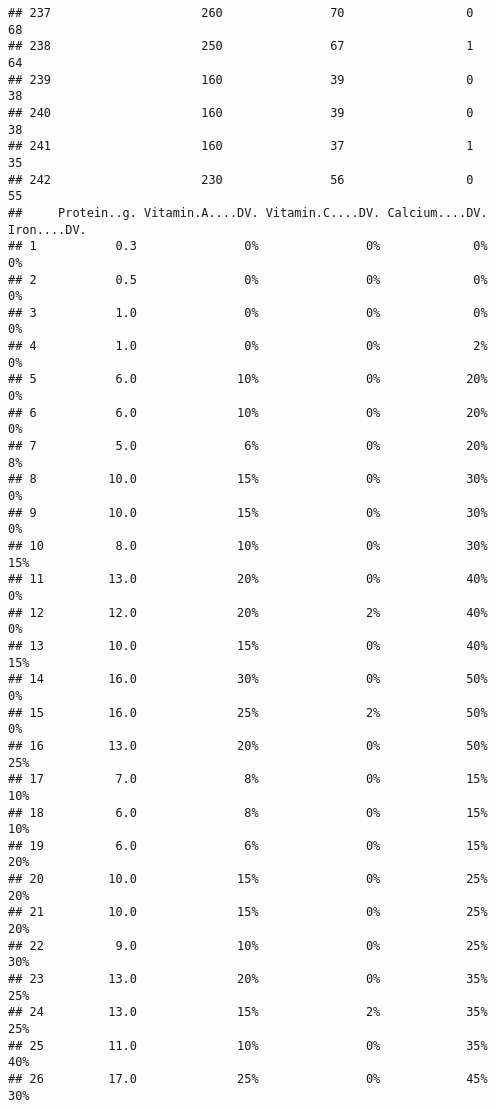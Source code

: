 \documentclass[
]{article}
\begin{document}
\begin{verbatim}
## 237                     260               70                 0         68
## 238                     250               67                 1         64
## 239                     160               39                 0         38
## 240                     160               39                 0         38
## 241                     160               37                 1         35
## 242                     230               56                 0         55
##     Protein..g. Vitamin.A....DV. Vitamin.C....DV. Calcium....DV. Iron....DV.
## 1           0.3               0%               0%             0%          0%
## 2           0.5               0%               0%             0%          0%
## 3           1.0               0%               0%             0%          0%
## 4           1.0               0%               0%             2%          0%
## 5           6.0              10%               0%            20%          0%
## 6           6.0              10%               0%            20%          0%
## 7           5.0               6%               0%            20%          8%
## 8          10.0              15%               0%            30%          0%
## 9          10.0              15%               0%            30%          0%
## 10          8.0              10%               0%            30%         15%
## 11         13.0              20%               0%            40%          0%
## 12         12.0              20%               2%            40%          0%
## 13         10.0              15%               0%            40%         15%
## 14         16.0              30%               0%            50%          0%
## 15         16.0              25%               2%            50%          0%
## 16         13.0              20%               0%            50%         25%
## 17          7.0               8%               0%            15%         10%
## 18          6.0               8%               0%            15%         10%
## 19          6.0               6%               0%            15%         20%
## 20         10.0              15%               0%            25%         20%
## 21         10.0              15%               0%            25%         20%
## 22          9.0              10%               0%            25%         30%
## 23         13.0              20%               0%            35%         25%
## 24         13.0              15%               2%            35%         25%
## 25         11.0              10%               0%            35%         40%
## 26         17.0              25%               0%            45%         30%

\end{verbatim}
\end{document}
